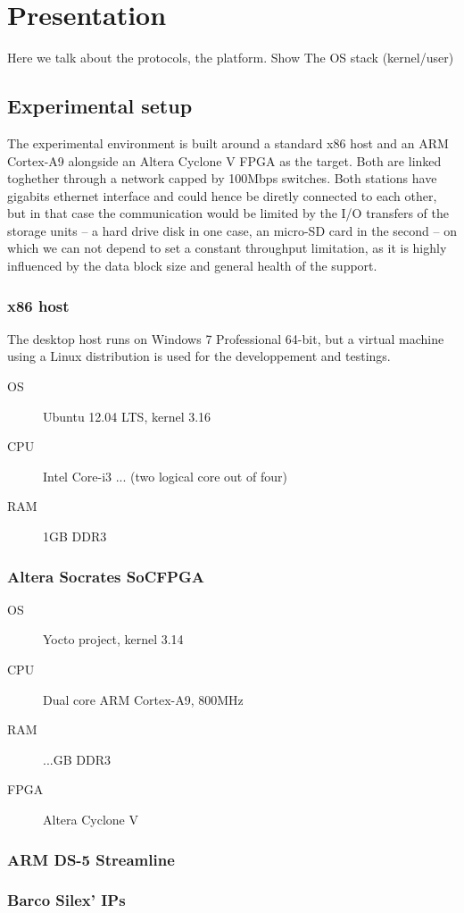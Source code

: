 \chapter{Presentation}
Here we talk about the protocols, the platform.
Show The OS stack (kernel/user)

\section{Experimental setup}
The experimental environment is built around a standard x86 host and an ARM Cortex-A9 alongside an Altera Cyclone V FPGA as the target.
Both are linked toghether through a network capped by 100Mbps switches.
Both stations have gigabits ethernet interface and could hence be diretly connected to each other, but in that case the communication would be limited by the I/O transfers of the storage units -- a hard drive disk in one case, an micro-SD card in the second -- on which we can not depend to set a constant throughput limitation, as it is highly influenced by the data block size and general health of the support.


\subsection{x86 host}
The desktop host runs on Windows 7 Professional 64-bit, but a virtual machine using a Linux distribution is used for the developpement and testings.

\begin{framed}
\begin{description}
	\item[OS] Ubuntu 12.04 LTS, kernel 3.16
	\item[CPU] Intel Core-i3 ... (two logical core out of four)
	\item[RAM] 1GB DDR3
\end{description}
\end{framed}

\subsection{Altera Socrates SoCFPGA}

\begin{framed}
\begin{description}
	\item[OS] Yocto project, kernel 3.14
	\item[CPU] Dual core ARM Cortex-A9, 800MHz
	\item[RAM] ...GB DDR3
	\item[FPGA] Altera Cyclone V
\end{description}
\end{framed}

\subsection{ARM DS-5 Streamline}

\subsection{Barco Silex' IPs}
